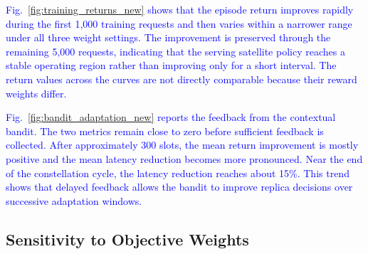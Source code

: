 \documentclass[10pt, conference, letterpaper]{IEEEtran}
\begin{document}

\textcolor{blue}{Fig.~\ref{fig:training_returns_new} shows that the episode return improves rapidly during the first 1,000 training requests and then varies within a narrower range under all three weight settings. The improvement is preserved through the remaining 5,000 requests, indicating that the serving satellite policy reaches a stable operating region rather than improving only for a short interval. The return values across the curves are not directly comparable because their reward weights differ.}

\textcolor{blue}{Fig.~\ref{fig:bandit_adaptation_new} reports the feedback from the contextual bandit. The two metrics remain close to zero before sufficient feedback is collected. After approximately 300 slots, the mean return improvement is mostly positive and the mean latency reduction becomes more pronounced. Near the end of the constellation cycle, the latency reduction reaches about 15\%. This trend shows that delayed feedback allows the bandit to improve replica decisions over successive adaptation windows.}


\subsection{Sensitivity to Objective Weights}
\end{document}

